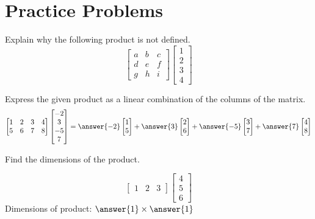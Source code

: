 \documentclass{ximera}
\begin{document}
\section*{Practice Problems}

\begin{problem}\label{prob:matprodundefined} Explain why the following product is not defined.
$$\begin{bmatrix}a&b&c\\d&e&f\\g&h&i\end{bmatrix}\begin{bmatrix}1\\2\\3\\4\end{bmatrix}$$
\end{problem}

\begin{problem}\label{prob:lincombcols}
Express the given product as a linear combination of the columns of the matrix.
$$\begin{bmatrix}1&2&3&4\\5&6&7&8\end{bmatrix}\begin{bmatrix}-2\\3\\-5\\7\end{bmatrix}=\answer{-2}\begin{bmatrix}1\\5\end{bmatrix}+\answer{3}\begin{bmatrix}2\\6\end{bmatrix}+\answer{-5}\begin{bmatrix}3\\7\end{bmatrix}+\answer{7}\begin{bmatrix}4\\8\end{bmatrix}$$
\end{problem}



\begin{problem}\label{prob:matproddim1}
Find the dimensions of the product.

$$\begin{bmatrix}1&2&3\end{bmatrix}\begin{bmatrix}4\\5\\6\end{bmatrix}$$
Dimensions of product: $\answer{1}\times \answer{1}$
\end{problem}
\end{document}

